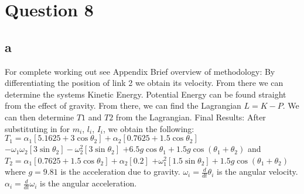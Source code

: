 \section{Question 8}
	\subsection{a}
	For complete working out see Appendix %
	Brief overview of methodology:\newline
	By differentiating the position of link 2 we obtain its velocity. From there we can determine the systems Kinetic Energy.\newline
	Potential Energy can be found straight from the effect of gravity.\newline
	From there, we can find the Lagrangian $L = K - P$.\newline
	We can then determine $T1$ and $T2$ from the Lagrangian.\newline
	\newline
	Final Results:\newline
	After substituting in for $m_{i}$, $l_{i}$, $I_{i}$, we obtain the following:\newline \newline
	$T_{1} = \alpha _{1} [5.1625 + 3\cos \theta _{2}] + \alpha _{2} [0.7625 + 1.5\cos \theta _{2}]$\newline
		$ - \omega _{1} \omega _{2} [3\sin \theta _{2}] - \omega ^2 _{2}[3\sin \theta _{2}] $\newline
			$ + 6.5g\cos \theta _{1} + 1.5g\cos (\theta _{1} + \theta _{2})$\newline
	and\newline
	$T_{2} = \alpha _{1} [0.7625 + 1.5\cos \theta _{2}] + \alpha _{2} [0.2]$\newline
		$ + \omega ^2 _{1}[1.5\sin \theta _{2}] + 1.5g\cos (\theta _{1} + \theta _{2})$\newline
	where\newline
		$g = 9.81$ is the acceleration due to gravity.\newline
		$\omega _{i} = \frac{d}{dt} \theta _{i}$ is the angular velocity.\newline
		$\alpha _{i} = \frac{d}{dt} \omega _{i}$ is the angular acceleration.\newline
		
